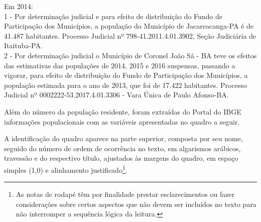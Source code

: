 \begin{table}[!ht]
{\begin{flushright}
\begin{minipage}[b]{13.9cm}
\begin{SingleSpace}
\begin{footnotesize}
\hspace*{0.9cm} Em 2014: \\
\hspace*{0.9cm}1 - Por determinação judicial e para efeito de distribuição do Fundo de Participação dos Municípios, a população do Município de Jacareacanga-PA é de 41.487 habitantes. Processo Judicial nº 798-41.2011.4.01.3902, Seção Judiciária de Itaituba-PA. \\
\hspace*{0.9cm} 2 - Por determinação judicial o Município de Coronel João Sá - BA teve os efeitos das estimativas das populações de 2014, 2015 e 2016 suspensas, passando a vigorar, para efeito de distribuição do Fundo de Participação dos Municípios, a população estimada para o ano de 2013, que foi de 17.422 habitantes. Processo Judicial nº 0002222-53.2017.4.01.3306 - Vara Única de Paulo Afonso-BA.
\end{footnotesize}
\end{SingleSpace}
\end{minipage}
\end{flushright}
}
\end{table}

\newpage

Além do número da população residente, foram extraídas do Portal do IBGE informações populacionais com as variáveis apresentadas no quadro a seguir.

A identificação do quadro aparece na parte superior, composta por seu nome, seguido do número de ordem de ocorrência no texto, em algarismos arábicos, travessão e do respectivo título, ajustados às margens do quadro, em espaço simples (1,0) e alinhamento justificado\footnote{As notas de rodapé têm por finalidade prestar esclarecimentos ou fazer considerações sobre certos aspectos que não devem ser incluídos no texto para não interromper a sequência lógica da leitura.}.

\begin{quadro}[!ht]	
\centering
\label{qua:exemplo-1}
\end{quadro}

